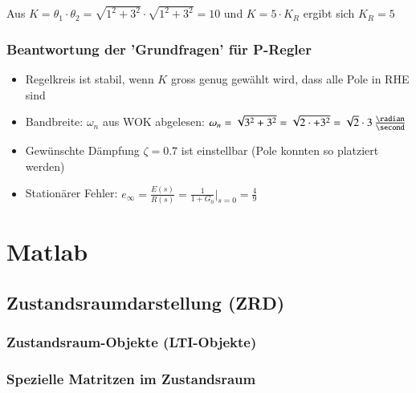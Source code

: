 \vspace{0.1cm}


Aus $K = \theta_1 \cdot \theta_2 = \sqrt{1^2 + 3^2} \cdot \sqrt{1^2 + 3^2} = 10$ und $K = 5 \cdot K_R$ ergibt sich $K_R = 5$


\subsubsection{Beantwortung der 'Grundfragen' für P-Regler}

\begin{itemize}
    \item Regelkreis ist stabil, wenn $K$ gross genug gewählt wird, dass alle Pole in RHE sind
    \item Bandbreite: $\omega_n$ aus WOK abgelesen: $\omega_n = \sqrt{3^2 + 3^2} = \sqrt{2 \cdot + 3^2} = \sqrt{2} \cdot 3 \, \frac{\radian}{\second}$
    \item Gewünschte Dämpfung $\zeta = 0.7$ ist einstellbar (Pole konnten so platziert werden)
    \item Stationärer Fehler: $e_{\infty} = \frac{E(s)}{R(s)} = \frac{1}{1 + G_0} \Big|_{s = 0} =\frac{4}{9}$
\end{itemize}



\section{Matlab}

\subsection{Zustandsraumdarstellung (ZRD)}

\subsubsection{Zustandsraum-Objekte (LTI-Objekte)}




\subsubsection{Spezielle Matritzen im Zustandsraum}




